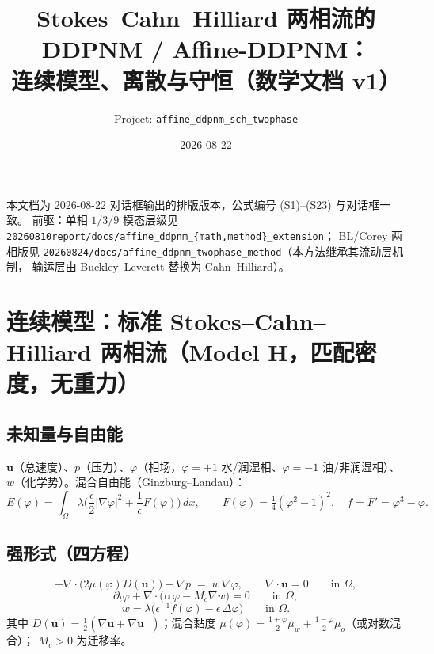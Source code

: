 \documentclass[11pt]{article}
\title{\bfseries Stokes--Cahn--Hilliard 两相流的 DDPNM / Affine-DDPNM：\\
连续模型、离散与守恒（数学文档 v1）}
\author{Project: \texttt{affine\_ddpnm\_sch\_twophase}}
\date{2026-08-22}
\theoremstyle{definition}
\theoremstyle{plain}
\theoremstyle{remark}
\newcommand{\vel}{\bm{u}}
\newcommand{\pres}{p}
\newcommand{\dd}{\,dx}
\begin{document}
\maketitle
\vspace{-1.5em}

\noindent 本文档为 2026-08-22 对话框输出的排版版本，公式编号 (S1)--(S23) 与对话框一致。
前驱：单相 $1/3/9$ 模态层级见 \texttt{20260810report/docs/affine\_ddpnm\_\{math,method\}\_extension}；
BL/Corey 两相版见 \texttt{20260824/docs/affine\_ddpnm\_twophase\_method}（本方法继承其流动层机制，
输运层由 Buckley--Leverett 替换为 Cahn--Hilliard）。

\section{连续模型：标准 Stokes--Cahn--Hilliard 两相流（Model H，匹配密度，无重力）}

\subsection{未知量与自由能}

$\vel$（总速度）、$\pres$（压力）、$\varphi$（相场，$\varphi=+1$ 水/润湿相、$\varphi=-1$
油/非润湿相）、$w$（化学势）。混合自由能（Ginzburg--Landau）：
\begin{equation}
E(\varphi)=\int_\Omega \lambda\Big(\frac{\epsilon}{2}|\nabla\varphi|^2
+\frac{1}{\epsilon}F(\varphi)\Big)\dd,\qquad
F(\varphi)=\tfrac14(\varphi^2-1)^2,\quad f=F'=\varphi^3-\varphi.
\tag{S1}\label{eq:S1}
\end{equation}

\subsection{强形式（四方程）}
\begin{equation}
-\nabla\cdot\big(2\mu(\varphi)D(\vel)\big)+\nabla p \;=\; w\,\nabla\varphi,
\qquad \nabla\cdot\vel=0 \qquad\text{in }\Omega,
\tag{S2}\label{eq:S2}
\end{equation}
\begin{equation}
\partial_t\varphi+\nabla\cdot\big(\vel\,\varphi-M_c\nabla w\big)=0
\qquad\text{in }\Omega,
\tag{S3}\label{eq:S3}
\end{equation}
\begin{equation}
w=\lambda\Big(\epsilon^{-1}f(\varphi)-\epsilon\,\Delta\varphi\Big)
\qquad\text{in }\Omega.
\tag{S4}\label{eq:S4}
\end{equation}
其中 $D(\vel)=\tfrac12(\nabla\vel+\nabla\vel^{\!\top})$；混合黏度
$\mu(\varphi)=\tfrac{1+\varphi}{2}\mu_w+\tfrac{1-\varphi}{2}\mu_o$（或对数混合）；
$M_c>0$ 为迁移率。
\end{document}
